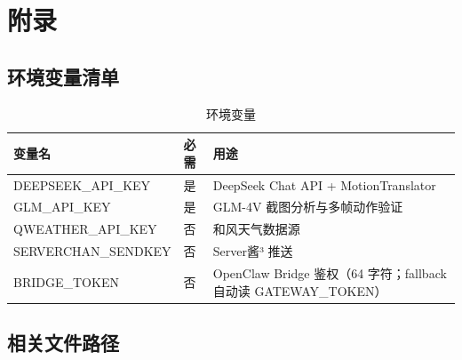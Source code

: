 \documentclass[12pt,a4paper]{ctexart}
\begin{document}
\section{附录}

\subsection{环境变量清单}

\begin{table}[H]
\centering
\caption{环境变量}
\label{tab:env}
\begin{tabular}{lll}
\toprule
\textbf{变量名} & \textbf{必需} & \textbf{用途} \\
\midrule
DEEPSEEK\_API\_KEY & 是 & DeepSeek Chat API + MotionTranslator \\
GLM\_API\_KEY & 是 & GLM-4V 截图分析与多帧动作验证 \\
QWEATHER\_API\_KEY & 否 & 和风天气数据源 \\
SERVERCHAN\_SENDKEY & 否 & Server酱³ 推送 \\
BRIDGE\_TOKEN & 否 & OpenClaw Bridge 鉴权（64 字符；fallback 自动读 GATEWAY\_TOKEN） \\
\bottomrule
\end{tabular}
\end{table}

\subsection{相关文件路径}
\end{document}
